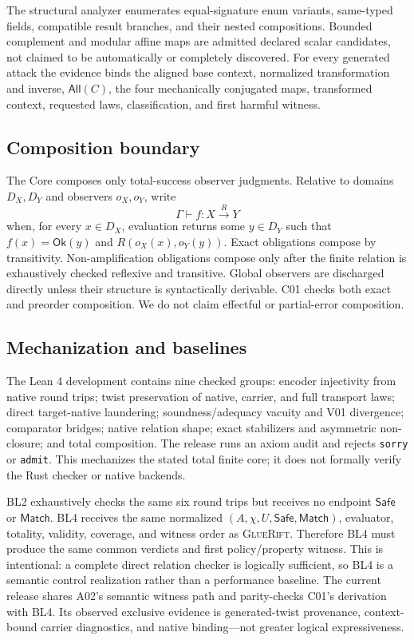 \documentclass[sigconf,anonymous,review]{acmart}
\newcommand{\sys}{\textsc{GlueRift}\xspace}
\newcommand{\ok}{\mathsf{Ok}}
\newcommand{\safe}{\mathsf{Safe}}
\newcommand{\matchrel}{\mathsf{Match}}
\newcommand{\all}{\mathsf{All}}
\begin{document}
The structural analyzer enumerates equal-signature enum variants,
same-typed fields, compatible result branches, and their nested
compositions.  Bounded complement and modular affine maps are admitted
declared scalar candidates, not claimed to be automatically or
completely discovered.  For every generated attack the evidence binds
the aligned base context, normalized transformation and inverse,
$\all(C)$, the four mechanically conjugated maps, transformed context,
requested laws, classification, and first harmful witness.

\subsection{Composition boundary}

The Core composes only total-success observer judgments.  Relative to
domains $D_X,D_Y$ and observers $o_X,o_Y$, write
\[
\Gamma\vdash f:X\xrightarrow{R}Y
\]
when, for every $x\in D_X$, evaluation returns some $y\in D_Y$ such
that $f(x)=\ok(y)$ and $R(o_X(x),o_Y(y))$.  Exact obligations compose
by transitivity.
Non-amplification obligations compose only after the finite relation is
exhaustively checked reflexive and transitive.  Global observers are
discharged directly unless their structure is syntactically derivable.
C01 checks both exact and preorder composition.  We do not claim
effectful or partial-error composition.

\subsection{Mechanization and baselines}

The Lean 4 development contains nine checked groups: encoder
injectivity from native round trips; twist preservation of native,
carrier, and full transport laws; direct target-native laundering;
soundness/adequacy vacuity and V01 divergence; comparator bridges;
native relation shape; exact stabilizers and asymmetric non-closure;
and total composition.  The release runs an axiom audit and rejects
\texttt{sorry} or \texttt{admit}.  This mechanizes the stated total
finite core; it does not formally verify the Rust checker or native
backends.

BL2 exhaustively checks the same six round trips but receives no
endpoint $\safe$ or $\matchrel$.  BL4 receives the same normalized
$(A,\chi,U,\safe,\matchrel)$, evaluator, totality, validity, coverage,
and witness order as \sys.  Therefore BL4 must produce the same common
verdicts and first policy/property witness.  This is intentional: a
complete direct relation checker is logically sufficient, so BL4 is a
semantic control realization rather than a performance baseline.  The
current release shares A02's semantic witness path and parity-checks C01's
derivation with BL4.  Its observed exclusive evidence is generated-twist
provenance, context-bound carrier diagnostics, and native binding---not
greater logical expressiveness.
\end{document}
